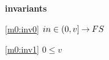 \textbf{invariants}
\begin{block}
\item[ \eqref{m0:inv0} ]{$in \in (0,v] \mathbin\rightarrow FS $} %
\item[ \eqref{m0:inv1} ]{$0 \le v $} %
\end{block}
